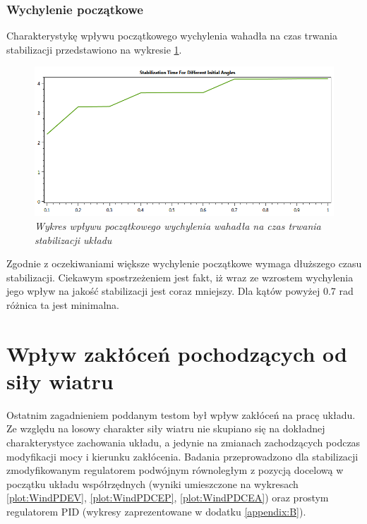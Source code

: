 \documentclass[12pt, oneside]{report}
\theoremstyle{definition}
\begin{document}
\subsubsection{Wychylenie początkowe}
Charakterystykę wpływu początkowego wychylenia wahadła na czas trwania stabilizacji przedstawiono na wykresie \ref{plot:PendulumAngleQuality}.
\begin{figure}[H]
	\centering
		\includegraphics[width = 350pt]{PendulumAngleQuality} 
		\caption{\textit{Wykres wpływu początkowego wychylenia wahadła na czas trwania stabilizacji układu}}
		\label{plot:PendulumAngleQuality}
\end{figure}

Zgodnie z oczekiwaniami większe wychylenie początkowe wymaga dłuższego czasu stabilizacji. Ciekawym spostrzeżeniem jest fakt, iż wraz ze wzrostem wychylenia jego wpływ na jakość stabilizacji jest coraz mniejszy. Dla kątów powyżej 0.7 rad różnica ta jest minimalna.

\section{Wpływ zakłóceń pochodzących od siły wiatru}
Ostatnim zagadnieniem poddanym testom był wpływ zakłóceń na pracę układu. Ze względu na losowy charakter siły wiatru nie skupiano się na dokładnej charakterystyce zachowania układu, a jedynie na zmianach zachodzących podczas modyfikacji mocy i kierunku zakłócenia. Badania przeprowadzono dla stabilizacji zmodyfikowanym regulatorem podwójnym równoległym z pozycją docelową w początku układu współrzędnych (wyniki umieszczone na wykresach \ref{plot:WindPDEV}, \ref{plot:WindPDCEP}, \ref{plot:WindPDCEA}) oraz prostym regulatorem PID (wykresy zaprezentowane w dodatku \ref{appendix:B}).
\end{document}
